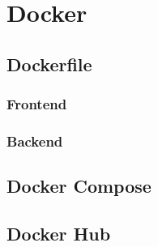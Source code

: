 \chapter{Docker}\label{ch:hosting}

\section{Dockerfile}
\subsection{Frontend}
\subsection{Backend}

\section{Docker Compose}

\section{Docker Hub}
